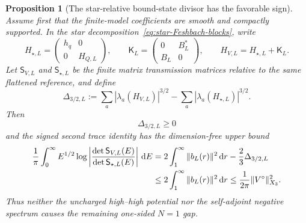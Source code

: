 \documentclass[11pt]{article}
\newcommand{\dd}{\,\mathrm d}
\newtheorem{proposition}[theorem]{Proposition}
\theoremstyle{definition}
\theoremstyle{remark}
\begin{document}
\begin{proposition}[The star-relative bound-state divisor has the favorable sign]
\label{prop:star-relative-signed-trace}
Assume first that the finite-model coefficients are smooth and compactly
supported.  In the star decomposition~\eqref{eq:star-Feshbach-blocks}, write
\begin{equation}
 H_{\star,L}=\begin{pmatrix}h_q&0\\0&H_{Q,L}\end{pmatrix},
 \qquad
 \mathsf K_L=\begin{pmatrix}0&B_L^*\\B_L&0\end{pmatrix},
 \qquad H_{V,L}=H_{\star,L}+\mathsf K_L.
 \label{eq:star-sign-flip-pair}
\end{equation}
Let $\mathsf S_{V,L}$ and $\mathsf S_{\star,L}$ be the finite matrix
transmission matrices relative to the same flattened reference, and define
\begin{equation}
 \Delta_{3/2,L}:=\sum_a|\lambda_a(H_{V,L})|^{3/2}
 -\sum_a|\lambda_a(H_{\star,L})|^{3/2}.
 \label{eq:star-relative-negative-moment}
\end{equation}
Then
\begin{equation}
 \Delta_{3/2,L}\geq0
 \label{eq:star-relative-negative-moment-sign}
\end{equation}
and the signed second trace identity has the dimension-free upper bound
\begin{align}
 \frac1\pi\int_0^\infty E^{1/2}
  \log\left|\frac{\det\mathsf S_{V,L}(E)}
                       {\det\mathsf S_{\star,L}(E)}\right|\dd E
 &=2\int_1^\infty\|b_L(r)\|^2\dd r
   -\frac23\Delta_{3/2,L}\notag\\
 &\leq2\int_1^\infty\|b_L(r)\|^2\dd r
 \leq\frac1{2\pi}\|V^\circ\|_{X_3}^2.
 \label{eq:star-relative-signed-trace-bound}
\end{align}
Thus neither the uncharged high--high potential nor the self-adjoint negative
spectrum causes the remaining one-sided $N=1$ gap.
\end{proposition}
\end{document}
